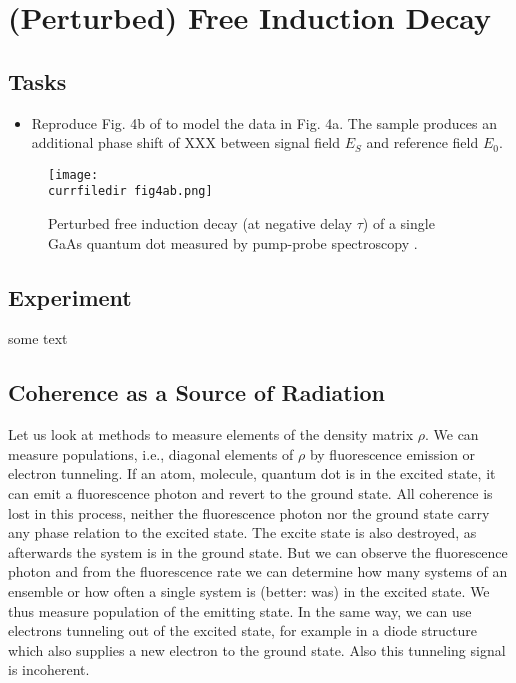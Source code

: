 

\chapter{(Perturbed) Free Induction Decay}



\section{Tasks}

\begin{itemize}
\item Reproduce Fig. 4b of \cite{Wolpert:2012hs} to model the data in Fig. 4a. The sample produces an additional phase shift of XXX between signal field $E_S$ and reference field $E_0$.
\end{itemize}

\begin{figure}
\centering
\texttt{[image: \\currfiledir fig4ab.png]}
\caption{Perturbed free induction decay (at negative delay $\tau$) of a single GaAs quantum dot measured by pump-probe spectroscopy \citep{Wolpert:2012hs}.}
\end{figure}

\section{Experiment}

some text

\section{Coherence as a Source of Radiation}


Let us look at methods to measure elements of the density matrix $\rho$. We can measure populations, i.e., diagonal elements of $\rho$ by fluorescence emission or electron tunneling. If an atom, molecule, quantum dot is in the excited state, it can emit a fluorescence photon and revert to the ground state. All coherence is lost in this process, neither the fluorescence photon nor the ground state carry any phase relation to the excited state. The excite state is also destroyed, as afterwards the system is in the ground state. But we can observe the fluorescence photon and from the fluorescence rate we can determine how many systems of an ensemble or how often a single system is (better: was) in the excited state. We thus measure population of the emitting state. In the same way, we can use electrons tunneling out of the excited state, for example in a diode structure which also supplies  a new electron to the ground state. Also this tunneling signal is incoherent.

